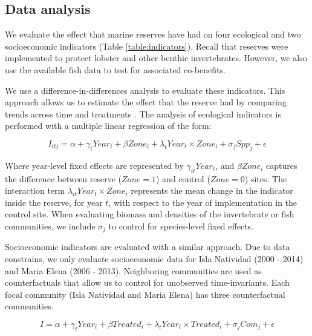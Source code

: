\documentclass{frontiersSCNS}
\theoremstyle{definition}
\theoremstyle{definition}
\theoremstyle{definition}
\theoremstyle{remark}
\begin{document}
\subsection{Data analysis}\label{data-analysis}

We evaluate the effect that marine reserves have had on four ecological
and two socioeconomic indicators (Table \ref{table:indicators}). Recall
that reserves were implemented to protect lobster and other benthic
invertebrates. However, we also use the available fish data to test for
associated co-benefits.

We use a difference-in-differences analysis to evaluate these
indicators. This approach allows us to estimate the effect that the
reserve had by comparing trends across time and treatments
\citep{moland_2013-VP,Villasenor-Derbez_2018}. The analysis of
ecological indicators is performed with a multiple linear regression of
the form:

\begin{equation}
I_{itj} = \alpha + \gamma_{t} Year_t + \beta Zone_i + \lambda_{t} Year_t\times Zone_i + \sigma_jSpp_j + \epsilon
\label{eqn:reg_bio}
\end{equation}

Where year-level fixed effects are represented by
\(\gamma_{it} Year_t\), and \(\beta Zone_i\) captures the difference
between reserve (\(Zone = 1\)) and control (\(Zone = 0\)) sites. The
interaction term \(\lambda_{it} Year_t\times Zone_i\) represents the
mean change in the indicator inside the reserve, for year \(t\), with
respect to the year of implementation in the control site. When
evaluating biomass and densities of the invertebrate or fish
communities, we include \(\sigma_j\) to control for species-level fixed
effects.

Socioeconomic indicators are evaluated with a similar approach. Due to
data constrains, we only evaluate socioeconomic data for Isla Natividad
(2000 - 2014) and Maria Elena (2006 - 2013). Neighboring communities are
used as counterfactuals that allow us to control for unobserved
time-invariants. Each focal community (Isla Natividad and Maria Elena)
has three counterfactual communities.

\begin{equation}
I = \alpha + \gamma_{t} Year_t + \beta Treated_i + \lambda_{t} Year_t\times Treated_i + \sigma_jCom_j +\epsilon
\label{eqn:soc_reg}
\end{equation}
\end{document}
